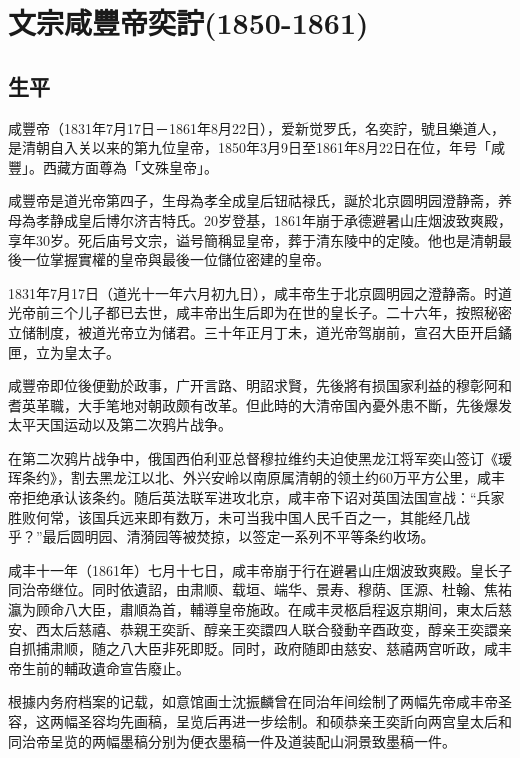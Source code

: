 
\section{文宗咸豐帝奕詝\tiny(1850-1861)}

\subsection{生平}

咸豐帝（1831年7月17日－1861年8月22日），爱新觉罗氏，名奕詝，號且樂道人，是清朝自入关以来的第九位皇帝，1850年3月9日至1861年8月22日在位，年号「咸豐」。西藏方面尊為「文殊皇帝」。

咸豐帝是道光帝第四子，生母為孝全成皇后钮祜禄氏，誕於北京圆明园澄静斋，养母為孝静成皇后博尔济吉特氏。20岁登基，1861年崩于承德避暑山庄烟波致爽殿，享年30岁。死后庙号文宗，谥号簡稱显皇帝，葬于清东陵中的定陵。他也是清朝最後一位掌握實權的皇帝與最後一位儲位密建的皇帝。

1831年7月17日（道光十一年六月初九日），咸丰帝生于北京圆明园之澄静斋。时道光帝前三个儿子都已去世，咸丰帝出生后即为在世的皇长子。二十六年，按照秘密立储制度，被道光帝立为储君。三十年正月丁未，道光帝驾崩前，宣召大臣开启鐍匣，立为皇太子。

咸豐帝即位後便勤於政事，广开言路、明詔求賢，先後將有损国家利益的穆彰阿和耆英革職，大手笔地对朝政颇有改革。但此時的大清帝国內憂外患不斷，先後爆发太平天国运动以及第二次鸦片战争。

在第二次鸦片战争中，俄国西伯利亚总督穆拉维约夫迫使黑龙江将军奕山签订《瑷珲条约》，割去黑龙江以北、外兴安岭以南原属清朝的领土约60万平方公里，咸丰帝拒绝承认该条约。随后英法联军进攻北京，咸丰帝下诏对英国法国宣战：“兵家胜败何常，该国兵远来即有数万，未可当我中国人民千百之一，其能经几战乎？”最后圆明园、清漪园等被焚掠，以签定一系列不平等条约收场。

咸丰十一年（1861年）七月十七日，咸丰帝崩于行在避暑山庄烟波致爽殿。皇长子同治帝继位。同时依遺詔，由肃顺、载垣、端华、景寿、穆荫、匡源、杜翰、焦祐瀛为顾命八大臣，肅順為首，輔導皇帝施政。在咸丰灵柩启程返京期间，東太后慈安、西太后慈禧、恭親王奕訢、醇亲王奕譞四人联合發動辛酉政变，醇亲王奕譞亲自抓捕肃顺，随之八大臣非死即貶。同时，政府随即由慈安、慈禧两宫听政，咸丰帝生前的輔政遺命宣告廢止。

根據内务府档案的记载，如意馆画士沈振麟曾在同治年间绘制了两幅先帝咸丰帝圣容，这两幅圣容均先画稿，呈览后再进一步绘制。和硕恭亲王奕訢向两宫皇太后和同治帝呈览的两幅墨稿分别为便衣墨稿一件及道装配山洞景致墨稿一件。

